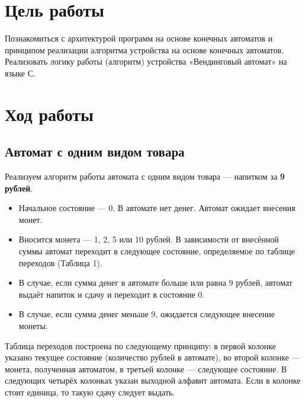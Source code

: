 \section{Цель работы}
Познакомиться с архитектурой программ на основе конечных автоматов и принципом реализации алгоритма устройства на основе конечных автоматов. Реализовать логику работы (алгоритм) устройства «Вендинговый автомат» на языке С.



\section{Ход работы}

\subsection{Автомат с одним видом товара}

Реализуем алгоритм работы автомата с одним видом товара — напитком за \textbf{9 рублей}.
\begin{itemize}
    \item Начальное состояние — 0. В автомате нет денег. Автомат ожидает внесения монет.
    \item Вносится монета — 1, 2, 5 или 10 рублей. В зависимости от внесённой суммы автомат переходит в следующее состояние, определяемое по таблице переходов (Таблица 1).
    \item В случае, если сумма денег в автомате больше или равна 9 рублей, автомат выдаёт напиток и сдачу и переходит в состояние 0.
    \item В случае, если сумма денег меньше 9, ожидается следующее внесение монеты.
\end{itemize}

Таблица переходов построена по следующему принципу: в первой колонке указано текущее состояние (количество рублей в автомате), во второй колонке — монета, полученная автоматом, в третьей колонке — следующее состояние. В следующих четырёх колонках указан выходной алфавит автомата. Если в колонке стоит единица, то такую сдачу следует выдать.

